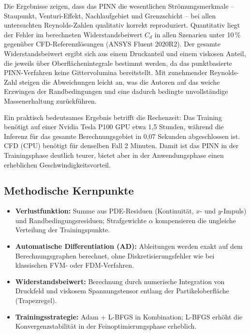 \documentclass[a4paper,12pt]{article}
\begin{document}
Die Ergebnisse zeigen, dass das PINN die wesentlichen Strömungsmerkmale --
Staupunkt, Venturi-Effekt, Nachlaufgebiet und Grenzschicht -- bei allen
untersuchten Reynolds-Zahlen qualitativ korrekt reproduziert. Quantitativ
liegt der Fehler im berechneten Widerstandsbeiwert $C_d$ in allen Szenarien
unter 10\,\% gegenüber CFD-Referenzlösungen (ANSYS Fluent 2020R2). Der
gesamte Widerstandsbeiwert ergibt sich aus einem Druckanteil und einem
viskosen Anteil, die jeweils über Oberflächenintegrale bestimmt werden, da
das punktbasierte PINN-Verfahren keine Gittervolumina bereitstellt. Mit
zunehmender Reynolds-Zahl steigen die Abweichungen leicht an, was die Autoren
auf das weiche Erzwingen der Randbedingungen und eine dadurch bedingte
unvollständige Massenerhaltung zurückführen.

Ein praktisch bedeutsames Ergebnis betrifft die Rechenzeit: Das Training
benötigt auf einer Nvidia Tesla P100 GPU etwa 1{,}5 Stunden, während die
Inferenz für das gesamte Berechnungsgebiet in 0{,}07 Sekunden abgeschlossen
ist. CFD (CPU) benötigt für denselben Fall 2 Minuten. Damit ist das PINN
in der Trainingsphase deutlich teurer, bietet aber in der Anwendungsphase
einen erheblichen Geschwindigkeitsvorteil.

\subsection*{Methodische Kernpunkte}

\begin{itemize}
    \item \textbf{Verlustfunktion:} Summe aus PDE-Residuen (Kontinuität,
    $x$- und $y$-Impuls) und Randbedingungsresiduen; Strafgewichte $\alpha$
    kompensieren die ungleiche Verteilung der Trainingspunkte.
    \item \textbf{Automatische Differentiation (AD):} Ableitungen werden
    exakt auf dem Berechnungsgraphen berechnet, ohne Diskretisierungsfehler
    wie bei klassischen FVM- oder FDM-Verfahren.
    \item \textbf{Widerstandsbeiwert:} Berechnung durch numerische Integration
    von Druckfeld und viskosem Spannungstensor entlang der Partikeloberfläche
    (Trapezregel).
    \item \textbf{Trainingsstrategie:} Adam + L-BFGS in Kombination; L-BFGS
    erhöht die Konvergenzstabilität in der Feinoptimierungsphase erheblich.
\end{itemize}
\end{document}
